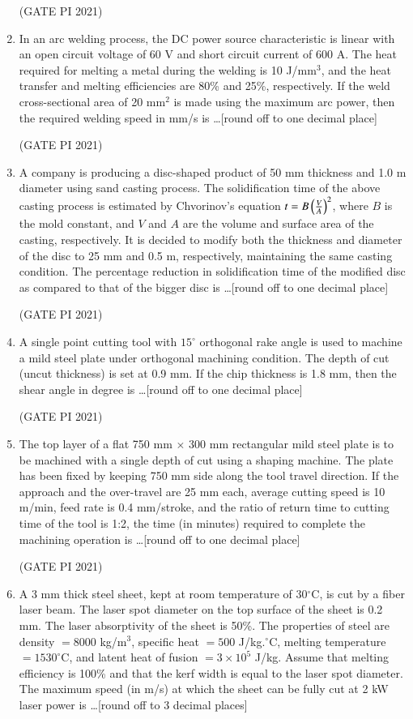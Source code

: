 \documentclass[journal,12pt,onecolumn]{IEEEtran}
\theoremstyle{remark}
\begin{document}
\begin{enumerate}
\hfill (GATE PI 2021)

\item
In an arc welding process, the DC power source characteristic is linear with an open circuit voltage of 60 V and short circuit current of 600 A. The heat required for melting a metal during the welding is 10 J/mm$^3$, and the heat transfer and melting efficiencies are 80\% and 25\%, respectively. If the weld cross-sectional area of 20 mm$^2$ is made using the maximum arc power, then the required welding speed in mm/s is \ldots [round off to one decimal place]

\hfill (GATE PI 2021)

\item
A company is producing a disc-shaped product of 50 mm thickness and 1.0 m diameter using sand casting process. The solidification time of the above casting process is estimated by Chvorinov's equation $t = B \left(\frac{V}{A}\right)^2$, where $B$ is the mold constant, and $V$ and $A$ are the volume and surface area of the casting, respectively. It is decided to modify both the thickness and diameter of the disc to 25 mm and 0.5 m, respectively, maintaining the same casting condition. The percentage reduction in solidification time of the modified disc as compared to that of the bigger disc is \ldots [round off to one decimal place]

\hfill (GATE PI 2021)

\item
A single point cutting tool with $15^\circ$ orthogonal rake angle is used to machine a mild steel plate under orthogonal machining condition. The depth of cut (uncut thickness) is set at 0.9 mm. If the chip thickness is 1.8 mm, then the shear angle in degree is \ldots [round off to one decimal place]

\hfill (GATE PI 2021)

\item
The top layer of a flat 750 mm $\times$ 300 mm rectangular mild steel plate is to be machined with a single depth of cut using a shaping machine. The plate has been fixed by keeping 750 mm side along the tool travel direction. If the approach and the over-travel are 25 mm each, average cutting speed is 10 m/min, feed rate is 0.4 mm/stroke, and the ratio of return time to cutting time of the tool is 1:2, the time (in minutes) required to complete the machining operation is \ldots [round off to one decimal place]

\hfill (GATE PI 2021)

\item
A 3 mm thick steel sheet, kept at room temperature of 30$^\circ$C, is cut by a fiber laser beam. The laser spot diameter on the top surface of the sheet is 0.2 mm. The laser absorptivity of the sheet is 50\%. The properties of steel are density $= 8000$ kg/m$^3$, specific heat $= 500$ J/kg.$^\circ$C, melting temperature $= 1530^\circ$C, and latent heat of fusion $= 3\times10^5$ J/kg. Assume that melting efficiency is 100\% and that the kerf width is equal to the laser spot diameter. The maximum speed (in m/s) at which the sheet can be fully cut at 2 kW laser power is \ldots [round off to 3 decimal places]


\end{enumerate}
\end{document}
